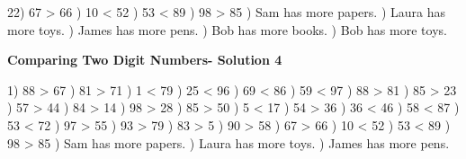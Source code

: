 \documentclass{article}%
\begin{document}
22) 67 > 66%
) 10 < 52%
) 53 < 89%
) 98 > 85%
) Sam has more papers.%
) Laura has more toys.%
) James has more pens.%
) Bob has more books.%
) Bob has more toys.%
\newline%
\newpage%
\large%
\begin{center}%
\textbf{Comparing Two Digit Numbers- Solution 4}%
\newline%
\end{center} \normalsize%
1) 88 > 67%
) 81 > 71%
) 1 < 79%
) 25 < 96%
) 69 < 86%
) 59 < 97%
) 88 > 81%
) 85 > 23%
) 57 > 44%
) 84 > 14%
) 98 > 28%
) 85 > 50%
) 5 < 17%
) 54 > 36%
) 36 < 46%
) 58 < 87%
) 53 < 72%
) 97 > 55%
) 93 > 79%
) 83 > 5%
) 90 > 58%
) 67 > 66%
) 10 < 52%
) 53 < 89%
) 98 > 85%
) Sam has more papers.%
) Laura has more toys.%
) James has more pens.%
\end{document}
